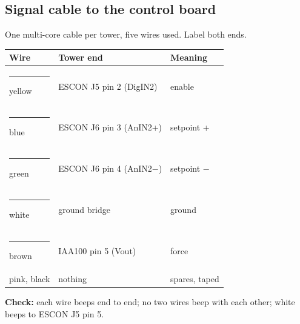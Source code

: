 \subsection{Signal cable to the control board}
One multi-core cable per tower, five wires used. Label both ends.
\begin{table}[H]\centering\small
\begin{tabular}{lll}
\toprule
Wire & Tower end & Meaning \\
\midrule
\textcolor{wyellow}{\rule{1.2em}{0.6em}} yellow & ESCON J5 pin 2 (DigIN2) & enable \\
\textcolor{wblue}{\rule{1.2em}{0.6em}} blue & ESCON J6 pin 3 (AnIN2+) & setpoint + \\
\textcolor{wgreen}{\rule{1.2em}{0.6em}} green & ESCON J6 pin 4 (AnIN2$-$) & setpoint $-$ \\
\textcolor{wwhite}{\rule{1.2em}{0.6em}} white & ground bridge & ground \\
\textcolor{wbrown}{\rule{1.2em}{0.6em}} brown & IAA100 pin 5 (Vout) & force \\
pink, black & nothing & spares, taped \\
\bottomrule
\end{tabular}
\end{table}

\textbf{Check:} each wire beeps end to end; no two wires beep with each other; white beeps to ESCON J5 pin 5.
